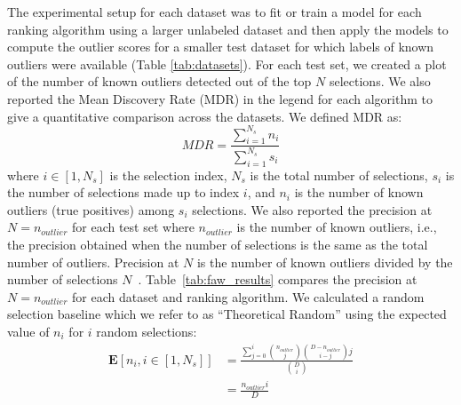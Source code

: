 \documentclass[utf8]{frontiersFPHY} %
\begin{document}
%
%
%

The experimental setup for each dataset was to fit or train a model for
each ranking algorithm using a larger unlabeled dataset and then apply 
the models to compute the outlier scores for a smaller test dataset for which
labels of known outliers were available (Table \ref{tab:datasets}). 
For each test set, we created a plot of the number of known outliers 
detected out of the top $N$ selections. We also 
reported the Mean Discovery Rate (MDR) in the legend
for each algorithm to give a quantitative comparison across the datasets. 
We defined MDR as:
\begin{equation}
MDR = \frac{\sum^{N_s}_{i=1} n_i}{\sum^{N_s}_{i=1} s_i}
\end{equation}
where $i \in [1, N_s]$ is the selection index,
$N_s$ is the total number of selections,
$s_i$ is the number of selections made up to index $i$,
and $n_i$ is the number of known outliers (true positives)
among $s_i$ selections.
We also reported the precision at $N=n_{outlier}$ for each test set where
$n_{outlier}$ is the number of known outliers, i.e.,  the precision obtained 
when the number of selections is the same as the total number of outliers. 
Precision at $N$ is the number of known outliers divided by the number of 
selections $N$~\citep{campos2016evaluation}.
Table~\ref{tab:faw_results} compares the precision at $N=n_{outlier}$ for
each dataset and ranking algorithm. 
We calculated a random selection baseline which we refer to as ``Theoretical
Random'' using the expected value of $n_i$ for $i$ random selections:
\begin{align}
\mathbf{E}[n_i, i \in[1, N_s]] &= \frac{\sum^i_{j=0} {n_{outlier}\choose j} {D-n_{outlier}\choose i-j} j}{{D\choose i}} \\
&= \frac{n_{outlier}i}{D}
\end{align}
\end{document}
